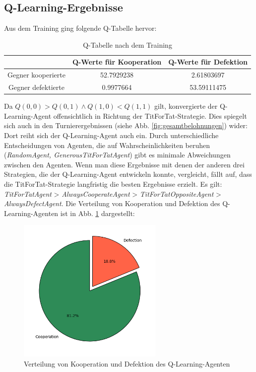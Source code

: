 \subsection{Q-Learning-Ergebnisse}
Aus dem Training ging folgende Q-Tabelle hervor:
\begin{table}[H]
    \centering
    \begin{tabular}{c|c|c}
            & Q-Werte für Kooperation & Q-Werte für Defektion \\
        \hline
        Gegner kooperierte &  52.7929238 & 2.61803697\\
        \hline
        Gegner defektierte &  0.9977664 & 53.59111475 \\
    \end{tabular}
    \caption{Q-Tabelle nach dem Training}
    \label{table:qtableaftertraining}
\end{table}
Da $Q(0, 0) > Q(0, 1) \land Q(1, 0) < Q(1, 1)$ gilt, konvergierte der Q-Learning-Agent offensichtlich in Richtung der
TitForTat-Strategie. Dies spiegelt sich auch in den Turnierergebnissen (siehe Abb. \ref{fig:gesamtbelohnungen}) wider:
Dort reiht sich der Q-Learning-Agent auch ein. Durch unterschiedliche Entscheidungen von Agenten, die auf Wahrscheinlichkeiten 
beruhen (\textit{RandomAgent, \textit{GenerousTitForTatAgent}}) gibt es minimale Abweichungen zwischen den Agenten.
Wenn man diese Ergebnisse mit denen der anderen drei Strategien, die der Q-Learning-Agent entwickeln konnte, vergleicht,
fällt auf, dass die TitForTat-Strategie langfristig die besten Ergebnisse erzielt. Es gilt:
\textit{TitForTatAgent} > \textit{AlwaysCooperateAgent} > \textit{TitForTatOppositeAgent} > \textit{AlwaysDefectAgent}.
Die Verteilung von Kooperation und Defektion des Q-Learning-Agenten ist in Abb. \ref{fig:qverteilung} dargestellt:
\begin{figure}[H]
    \centering
    \includegraphics[width=7cm]{../poster/logos/qPie.png}
    \caption{Verteilung von Kooperation und Defektion des Q-Learning-Agenten}
    \label{fig:qverteilung}
\end{figure}


